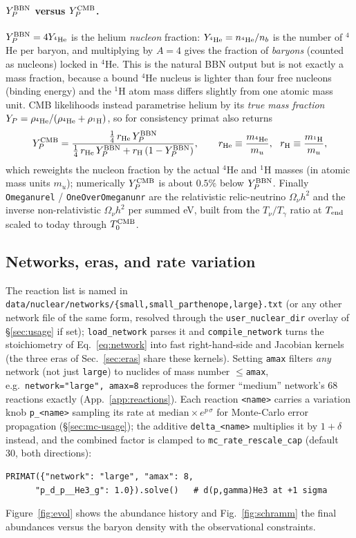 \documentclass[11pt,a4paper]{article}
\newcommand{\Tg}{T_\gamma}
\newcommand{\YP}{Y_P}
\newcommand{\code}[1]{\texttt{#1}}
\begin{document}
\paragraph{$\YP^{\rm BBN}$ versus $\YP^{\rm CMB}$.}
$\YP^{\rm BBN}=4Y_{^4{\rm He}}$ is the helium \emph{nucleon} fraction: $Y_{^4{\rm He}}=
n_{^4{\rm He}}/n_b$ is the number of $^4$He per baryon, and multiplying by $A=4$
gives the fraction of \emph{baryons} (counted as nucleons) locked in $^4$He.
This is the natural BBN output but is not exactly a mass fraction, because a
bound $^4$He nucleus is lighter than four free nucleons (binding energy) and the
$^1$H atom mass differs slightly from one atomic mass unit. CMB likelihoods
instead parametrise helium by its \emph{true mass fraction}
$Y_P=\rho_{^4{\rm He}}/(\rho_{^4{\rm He}}+\rho_{^1{\rm H}})$, so for consistency
primat also returns
\begin{equation}
  \YP^{\rm CMB}=\frac{\tfrac14\,r_{\rm He}\,\YP^{\rm BBN}}
                    {\tfrac14\,r_{\rm He}\,\YP^{\rm BBN}+r_{\rm H}\,(1-\YP^{\rm BBN})},
  \qquad r_{\rm He}\equiv\frac{m_{^4{\rm He}}}{m_u},\ \ r_{\rm H}\equiv\frac{m_{^1{\rm H}}}{m_u},
\end{equation}
which reweights the nucleon fraction by the actual $^4$He and $^1$H masses (in
atomic mass units $m_u$); numerically $\YP^{\rm CMB}$ is about $0.5\%$ below
$\YP^{\rm BBN}$. Finally \code{Omeganurel} / \code{OneOverOmeganunr} are the
relativistic relic-neutrino $\Omega_\nu h^2$ and the inverse non-relativistic
$\Omega_\nu h^2$ per summed eV, built from the $T_\nu/\Tg$ ratio at $T_{\rm end}$
scaled to today through $T_0^{\rm CMB}$.

\subsection{Networks, eras, and rate variation}
The reaction list is named in
\code{data/nuclear/networks/\{small,small\_parthenope,large\}.txt} (or any
other network file of the same form, resolved through the
\code{user\_nuclear\_dir} overlay of \S\ref{sec:usage} if set);
\code{load\_network} parses it and \code{compile\_network} turns the
stoichiometry of Eq.~\eqref{eq:network} into fast right-hand-side and
Jacobian kernels (the three eras of Sec.~\ref{sec:eras} share these kernels).
Setting \code{amax} filters \emph{any} network (not just \code{large}) to
nuclides of mass number $\le$\code{amax}, e.g.\ \code{network="large",
amax=8} reproduces the former ``medium'' network's 68 reactions exactly
(App.~\ref{app:reactions}). Each reaction \code{<name>} carries a variation
knob \code{p\_<name>} sampling its rate at $\text{median}\times e^{p\,\sigma}$
for Monte-Carlo error propagation (\S\ref{sec:mc-usage}); the additive
\code{delta\_<name>} multiplies it by $1+\delta$ instead, and the combined
factor is clamped to \code{mc\_rate\_rescale\_cap} (default 30, both directions):
\begin{lstlisting}[style=py]
PRIMAT({"network": "large", "amax": 8,
      "p_d_p__He3_g": 1.0}).solve()   # d(p,gamma)He3 at +1 sigma
\end{lstlisting}
Figure~\ref{fig:evol} shows the abundance history and Fig.~\ref{fig:schramm} the
final abundances versus the baryon density with the observational constraints.
\end{document}
